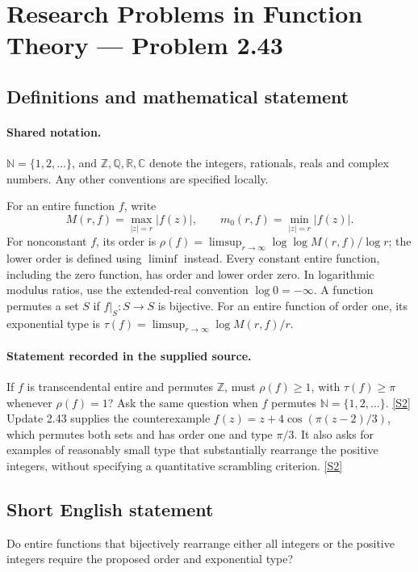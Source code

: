 \documentclass[11pt]{article}
\newcommand{\sref}[2]{\hyperlink{source:#1:#2}{[S#2]}}
\begin{document}
\section{Research Problems in Function Theory — Problem 2.43}\label{statement}

\subsection{Definitions and mathematical statement}

\paragraph{Shared notation.}$\mathbb N=\{1,2,\ldots\}$, and $\mathbb Z,\mathbb Q,\mathbb R,\mathbb C$ denote the integers, rationals, reals and complex numbers. Any other conventions are specified locally.


For an entire function $f$, write
\[
 M(r,f)=\max_{|z|=r}|f(z)|,\qquad m_0(r,f)=\min_{|z|=r}|f(z)|.
\]
For nonconstant $f$, its order is $\rho(f)=\limsup_{r\to\infty}\log\log M(r,f)/\log r$;
the lower order is defined using $\liminf$ instead. Every constant entire function, including the zero function, has order and lower order zero. In logarithmic modulus ratios, use the extended-real convention $\log0=-\infty$.
A function permutes a set $S$ if $f|_S:S\to S$ is bijective. For an entire function of order one, its exponential type is $\tau(f)=\limsup_{r\to\infty}\log M(r,f)/r$.

\paragraph{Statement recorded in the supplied source.}
If $f$ is transcendental entire and permutes $\mathbb Z$, must $\rho(f)\ge1$, with $\tau(f)\ge\pi$ whenever $\rho(f)=1$? Ask the same question when $f$ permutes $\mathbb N=\{1,2,\ldots\}$. \sref{statement}{2}
Update 2.43 supplies the counterexample $f(z)=z+4\cos(\pi(z-2)/3)$, which permutes both sets and has order one and type $\pi/3$. It also asks for examples of reasonably small type that substantially rearrange the positive integers, without specifying a quantitative scrambling criterion. \sref{statement}{2}
\subsection{Short English statement}
Do entire functions that bijectively rearrange either all integers or the positive integers require the proposed order and exponential type?
\end{document}
